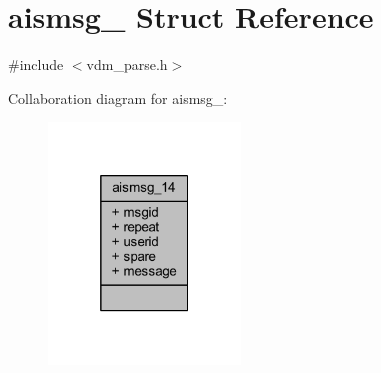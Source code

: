 \hypertarget{structaismsg__14}{}\section{aismsg\+\_ Struct Reference}
\label{structaismsg__14}


{\ttfamily \#include $<$vdm\+\_\+parse.\+h$>$}



Collaboration diagram for aismsg\+\_\+:
\nopagebreak
\begin{figure}[H]
\begin{center}
\leavevmode
\includegraphics[width=145pt]{structaismsg__14__coll__graph}
\end{center}
\end{figure}
